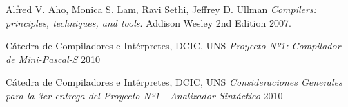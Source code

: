 \documentclass[a4paper,oneside]{report}
\begin{document}
\begin{thebibliography}{9}
  Alfred V. Aho, Monica S. Lam, Ravi Sethi, Jeffrey D. Ullman
  \emph{Compilers: principles, techniques, and tools}.
  Addison Wesley
  2nd Edition
  2007.
  
	Cátedra de Compiladores e Intérpretes, DCIC, UNS
	\emph{Proyecto Nº1: Compilador de Mini-Pascal-S}
	2010
	
	Cátedra de Compiladores e Intérpretes, DCIC, UNS
	\emph{Consideraciones Generales para la 3er entrega del Proyecto Nº1 - Analizador Sintáctico}
	2010

\end{thebibliography}
\end{document}

